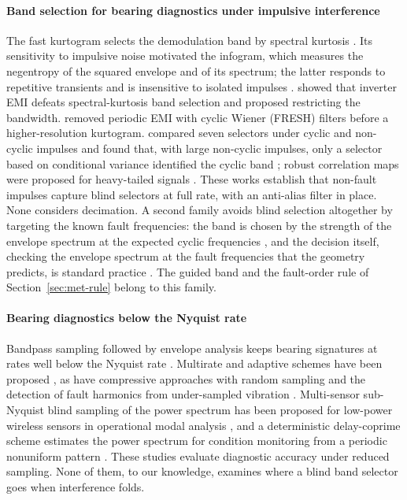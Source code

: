 \paragraph{Band selection for bearing diagnostics under impulsive interference}
The fast kurtogram selects the demodulation band by spectral kurtosis \citep{antoni2007kurtogram}.
Its sensitivity to impulsive noise motivated the infogram, which measures the negentropy of the
squared envelope and of its spectrum; the latter responds to repetitive transients and is
insensitive to isolated impulses \citep{antoni2016infogram}. \citet{smith2016emi} showed that
inverter EMI defeats spectral-kurtosis band selection and proposed restricting the bandwidth.
\citet{vaerenberg2025cyclicemi} removed periodic EMI with cyclic Wiener (FRESH) filters before a
higher-resolution kurtogram. \citet{hebdasobkowicz2020nongaussian} compared seven selectors under
cyclic and non-cyclic impulses and found that, with large non-cyclic impulses, only a selector based
on conditional variance identified the cyclic band \citep{hebdasobkowicz2020condvar}; robust
correlation maps were proposed for heavy-tailed signals \citep{hebdasobkowicz2025robustcorr}. These
works establish that non-fault impulses capture blind selectors at full rate, with an anti-alias
filter in place. None considers decimation. A second family avoids blind selection altogether by
targeting the known fault frequencies: the band is chosen by the strength of the envelope spectrum
at the expected cyclic frequencies \citep{smith2019demodband,mauricio2020iesfogram,
schmidt2020ifbigram}, and the decision itself, checking the envelope spectrum at the fault
frequencies that the geometry predicts, is standard practice \citep{randall2011bearing}. The guided
band and the fault-order rule of Section~\ref{sec:met-rule} belong to this family.

\paragraph{Bearing diagnostics below the Nyquist rate}
Bandpass sampling followed by envelope analysis keeps bearing signatures at rates well below the
Nyquist rate \citep{lu2018undersampled}. Multirate and adaptive schemes have been proposed
\citep{elbouharrouti2023multirate,zhao2026adaptive}, as have compressive approaches with random
sampling \citep{ahmed2018compressedbearing,tounsi2026cs} and the detection of fault harmonics from
under-sampled vibration \citep{tang2015harmoniccs}. Multi-sensor sub-Nyquist blind sampling of
the power spectrum has been proposed for low-power wireless sensors in operational modal analysis
\citep{gkoktsi2019psbs}, and a deterministic delay-coprime scheme estimates the power spectrum for
condition monitoring from a periodic nonuniform pattern \citep{cao2026dcscm}. These studies evaluate diagnostic accuracy under reduced sampling. None of
them, to our knowledge, examines where a blind band selector goes when interference folds.

